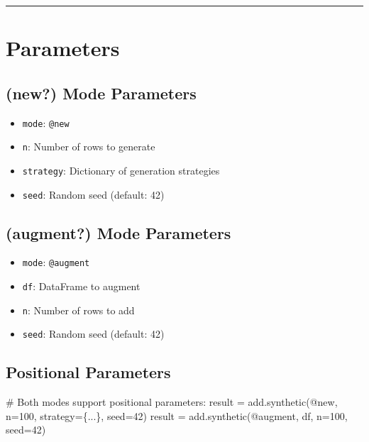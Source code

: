 \documentclass[
  letterpaper,
]{scrbook}
\newenvironment{Shaded}{\begin{snugshade}}{\end{snugshade}}
\newcommand{\CommentTok}[1]{\textcolor[rgb]{0.37,0.37,0.37}{#1}}
\newcommand{\DecValTok}[1]{\textcolor[rgb]{0.68,0.00,0.00}{#1}}
\newcommand{\NormalTok}[1]{\textcolor[rgb]{0.00,0.23,0.31}{#1}}
\newcommand{\OperatorTok}[1]{\textcolor[rgb]{0.37,0.37,0.37}{#1}}
\newcommand{\StringTok}[1]{\textcolor[rgb]{0.13,0.47,0.30}{#1}}
\providecommand{\tightlist}{%
  \setlength{\itemsep}{0pt}\setlength{\parskip}{0pt}}
\begin{document}
\begin{center}\rule{0.5\linewidth}{0.5pt}\end{center}

\section{Parameters}\label{parameters-3}

\subsection{\texorpdfstring{(\textbf{new?}) Mode
Parameters}{(new?) Mode Parameters}}\label{new-mode-parameters}

\begin{itemize}
\tightlist
\item
  \texttt{mode}: \texttt{\textquotesingle{}@new\textquotesingle{}}
\item
  \texttt{n}: Number of rows to generate
\item
  \texttt{strategy}: Dictionary of generation strategies
\item
  \texttt{seed}: Random seed (default: 42)
\end{itemize}

\subsection{\texorpdfstring{(\textbf{augment?}) Mode
Parameters}{(augment?) Mode Parameters}}\label{augment-mode-parameters}

\begin{itemize}
\tightlist
\item
  \texttt{mode}: \texttt{\textquotesingle{}@augment\textquotesingle{}}
\item
  \texttt{df}: DataFrame to augment
\item
  \texttt{n}: Number of rows to add
\item
  \texttt{seed}: Random seed (default: 42)
\end{itemize}

\subsection{Positional Parameters}\label{positional-parameters-3}

\begin{Shaded}
\begin{Highlighting}[]
\CommentTok{\# Both modes support positional parameters:}
\NormalTok{result }\OperatorTok{=}\NormalTok{ add.synthetic(}\StringTok{\textquotesingle{}@new\textquotesingle{}}\NormalTok{, n}\OperatorTok{=}\DecValTok{100}\NormalTok{, strategy}\OperatorTok{=}\NormalTok{\{...\}, seed}\OperatorTok{=}\DecValTok{42}\NormalTok{)}
\NormalTok{result }\OperatorTok{=}\NormalTok{ add.synthetic(}\StringTok{\textquotesingle{}@augment\textquotesingle{}}\NormalTok{, df, n}\OperatorTok{=}\DecValTok{100}\NormalTok{, seed}\OperatorTok{=}\DecValTok{42}\NormalTok{)}
\end{Highlighting}
\end{Shaded}
\end{document}
